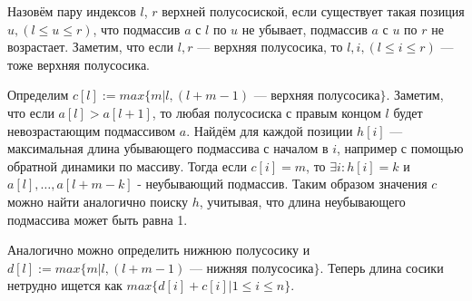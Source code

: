 \documentclass{article}
\author{Макаров Михаил}
\date{}
\begin{document}
    Назовём пару индексов $l$, $r$ верхней полусосиской, если существует такая позиция $u, (l \leq u \leq r)$, 
    что подмассив $a$ с $l$ по $u$ не убывает, подмассив $a$ с $u$ по $r$ не возрастает.
    Заметим, что если $l, r$ --- верхняя полусосика, то $l, i, (l \leq i \leq r)$ --- тоже верхняя
    полусосика.

    Определим $c[l] := max\{m| \text{$l, (l + m - 1)$ --- верхняя полусосика} \}$. 
    Заметим, что если $a[l] > a[l + 1]$, то любая 
    полусосиска с правым концом $l$ будет невозрастающим подмассивом $a$. Найдём для каждой позиции $h[i]$ ---
    максимальная длина убывающего подмассива с началом в $i$, например с помощью обратной динамики по массиву.
    Тогда если $c[i] = m$, то $\exists i: h[i] = k$ и $a[l], \ldots, a[l + m - k]$ - неубывающий подмассив.
    Таким образом значения $c$ можно найти аналогично поиску $h$, 
    учитывая, что длина неубывающего подмассива может быть равна 1.
    
    Аналогично можно определить нижнюю полусосику и $d[l] := max\{m| \text{$l, (l + m - 1)$ --- нижняя полусосика} \}$.
    Теперь длина сосики нетрудно ищется как $max\{d[i] + c[i]| 1 \leq i \leq n \}$.
\end{document}
